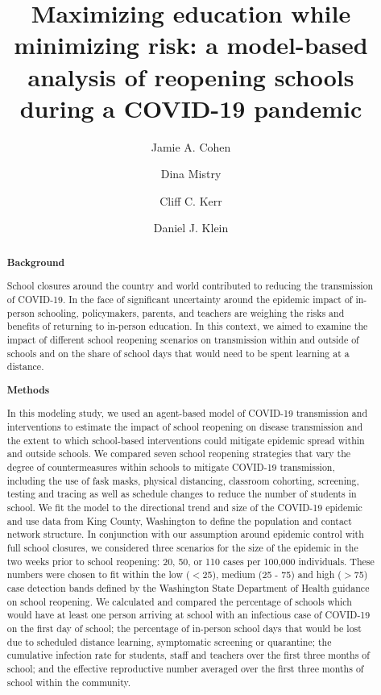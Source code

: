 \documentclass[preprint,12pt]{elsarticle}
\begin{document}
\begin{frontmatter}

\title{Maximizing education while minimizing risk: a model-based analysis of reopening schools during a COVID-19 pandemic}


\author[add1]{Jamie A. Cohen}
\author[add1]{Dina Mistry}
\author[add1,add2]{Cliff C. Kerr}
\author[add1]{Daniel J. Klein}

\address[add1]{Institute for Disease Modeling, Seattle, WA, USA}
\address[add2]{University of Sydney, Sydney, NSW, Australia}



\begin{abstract}

\noindent \textbf{Background}


\noindent School closures around the country and world contributed to reducing the transmission of COVID-19. In the face of significant uncertainty around the epidemic impact of in-person schooling, policymakers, parents, and teachers are weighing the risks and benefits of returning to in-person education. In this context, we aimed to examine the impact of different school reopening scenarios on transmission within and outside of schools and on the share of school days that would need to be spent learning at a distance.

\noindent \textbf{Methods}


\noindent In this modeling study, we used an agent-based model of COVID-19 transmission and interventions to estimate the impact of school reopening on disease transmission and the extent to which school-based interventions could mitigate epidemic spread within and outside schools. We compared seven school reopening strategies that vary the degree of countermeasures within schools to mitigate COVID-19 transmission, including the use of fask masks, physical distancing, classroom cohorting, screening, testing and tracing as well as schedule changes to reduce the number of students in school. We fit the model to the directional trend and size of the COVID-19 epidemic and use data from King County, Washington to define the population and contact network structure. In conjunction with our assumption around epidemic control with full school closures, we considered three scenarios for the size of the epidemic in the two weeks prior to school reopening: 20, 50, or 110 cases per 100,000 individuals. These numbers were chosen to fit within the low ($<$25), medium (25 - 75) and high ($>$75) case detection bands defined by the Washington State Department of Health guidance on school reopening. We calculated and compared the percentage of schools which would have at least one person arriving at school with an infectious case of COVID-19 on the first day of school; the percentage of in-person school days that would be lost due to scheduled distance learning, symptomatic screening or quarantine; the cumulative infection rate for students, staff and teachers over the first three months of school; and the effective reproductive number averaged over the first three months of school within the community.  


\end{abstract}
\end{frontmatter}
\end{document}
